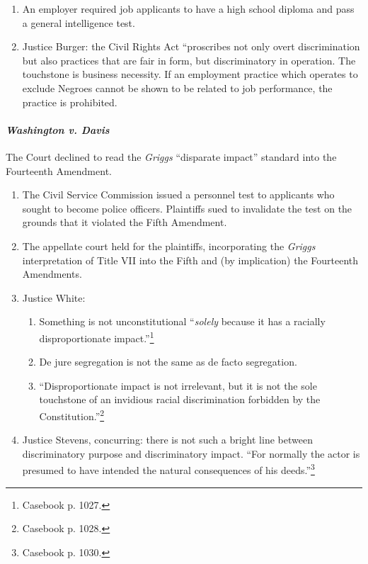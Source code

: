 \begin{enumerate}
    \item An employer required job applicants to have a high school diploma 
    and pass a general intelligence test.
    \item Justice Burger: the Civil Rights Act ``proscribes not only overt 
    discrimination but also practices that are fair in form, but 
    discriminatory in operation. The touchstone is business necessity. If an 
    employment practice which operates to exclude Negroes cannot be shown to 
    be related to job performance, the practice is prohibited.
\end{enumerate}

\paragraph{\emph{Washington v. Davis}}

The Court declined to read the \emph{Griggs} ``disparate impact'' standard 
into the Fourteenth Amendment.

\begin{enumerate}
    \item The Civil Service Commission issued a personnel test to applicants 
    who sought to become police officers. Plaintiffs sued to invalidate the 
    test on the grounds that it violated the Fifth Amendment.
    \item The appellate court held for the plaintiffs, incorporating the 
    \emph{Griggs} interpretation of Title VII into the Fifth and (by 
    implication) the Fourteenth Amendments.
    \item Justice White:
    \begin{enumerate}
        \item Something is not unconstitutional ``\emph{solely} because it has 
        a racially disproportionate impact.''\footnote{Casebook p. 1027.}
        \item De jure segregation is not the same as de facto segregation.
        \item ``Disproportionate impact is not irrelevant, but it is not the 
        sole touchstone of an invidious racial discrimination forbidden by the 
        Constitution.''\footnote{Casebook p. 1028.}
    \end{enumerate}
    \item Justice Stevens, concurring: there is not such a bright line between 
    discriminatory purpose and discriminatory impact. ``For normally the actor 
    is presumed to have intended the natural consequences of his 
    deeds.''\footnote{Casebook p. 1030.}
\end{enumerate}

